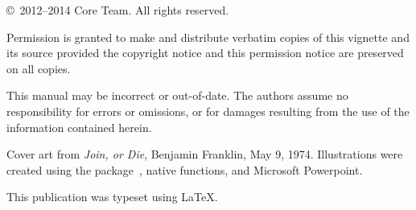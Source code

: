 \null
\vfill

\copyright\ 2012--2014 \pbdR Core Team.  All rights reserved.

Permission is granted to make and distribute verbatim copies of this vignette
and its source provided the copyright notice and this permission notice are
preserved on all copies.

This manual may be incorrect or out-of-date.  The authors assume
no responsibility for errors or omissions, or for damages resulting
from the use of the information contained herein.

Cover art from \textit{Join, or Die}, Benjamin Franklin, May 9, 1974.  Illustrations were created 
using the  package~\citep{ggplot2}, native  functions, and Microsoft 
Powerpoint.

This publication was typeset using \LaTeX. 
